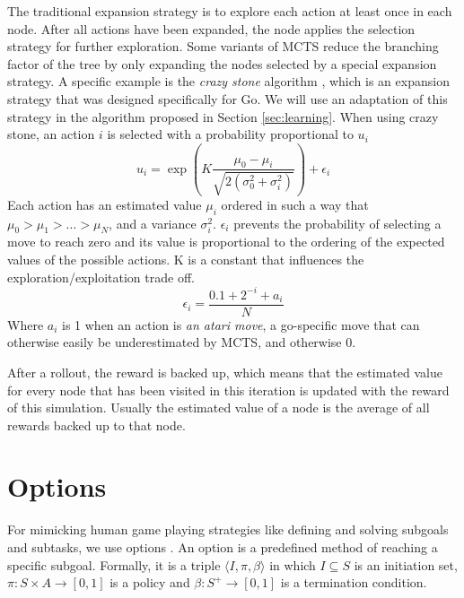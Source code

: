 The traditional expansion strategy is to explore each action at least once in
each node. After all actions have been expanded, the node applies the selection
strategy for further exploration. Some variants of MCTS reduce the branching
factor of the tree by only expanding the nodes selected by a special expansion
strategy. A specific example is the \emph{crazy stone} algorithm
\cite{coulom2007efficient}, which is an expansion strategy that was designed
specifically for Go. We will use an adaptation of this strategy in the algorithm
proposed in Section \ref{sec:learning}.  When using crazy stone, an action $i$
is selected with a probability proportional to $u_i$
\begin{equation}
	\label{eq:crazystone}
	u_i = \exp\left(K \frac{\mu_0 - \mu_i}{\sqrt{2\left(\sigma_0^2 +
\sigma_i^2\right)}}\right) + \epsilon_i
\end{equation}
Each action has an estimated value $\mu_i$ ordered in such a way that $\mu_0 >
\mu_1 > \ldots > \mu_N$, and a variance $\sigma_i^2$. $\epsilon_i$ prevents 
the probability of selecting a move to reach zero and its value is proportional to
the ordering of the expected values of the possible actions. K is a constant
that influences the exploration/exploitation trade off.
\begin{equation}
	\label{eq:epsilon}
	\epsilon_i = \frac{0.1 + 2^{-i} + a_i}{N}
\end{equation}
Where $a_i$ is 1 when an action is \emph{an atari move}, a go-specific
move that can otherwise easily be underestimated by MCTS, and otherwise 0.

After a rollout, the reward is backed up, which means that the estimated value
for every node that has been visited in this iteration is updated with the
reward of this simulation. Usually the estimated value of a node is the average
of all rewards backed up to that node.

\section{Options}
\label{subsec:options}
For mimicking human game playing strategies like defining and solving subgoals
and subtasks, we use options \cite{sutton1999between, barto2003recent}. An
option is a predefined method of reaching a specific subgoal. Formally, it is a
triple $\langle I, \pi, \beta\rangle$ in which $I \subseteq S$ is an initiation
set, $\pi: S \times A \rightarrow [0, 1]$ is a policy and $\beta: S^+
\rightarrow[0,1]$ is a termination condition.

